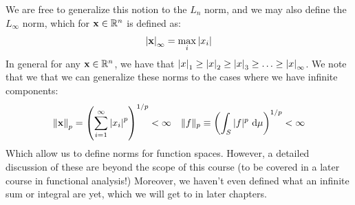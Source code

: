 \noindent We are free to generalize this notion to the $L_n$ norm, and we may also define the $L_{\infty}$ norm, which for $\mathbf{x} \in \mathbb{R}^n$ is defined as:
\begin{align*}
    \abs{\mathbf{x}}_\infty = \max_i \abs{x_i}
\end{align*}
In general for any $\mathbf{x} \in \mathbb{R}^n$, we have that $\abs{x}_1 \geq \abs{x}_2 \geq \abs{x}_3 \geq \ldots \geq \abs{x}_\infty$. We note that we that we can generalize these norms to the cases where we have infinite components:
\begin{align*}
    \norm{\mathbf{x}}_p = \left(\sum_{i = 1}^\infty \abs{x_i}^p\right)^{1/p} < \infty \quad
    \|f\|_{p} \equiv\left(\int_{S}|f|^{p} \mathrm{~d} \mu\right)^{1 / p}<\infty
\end{align*}
Which allow us to define norms for function spaces. However, a detailed discussion of these are beyond the scope of this course (to be covered in a later course in functional analysis!) Moreover, we haven't even defined what an infinite sum or integral are yet, which we will get to in later chapters. 